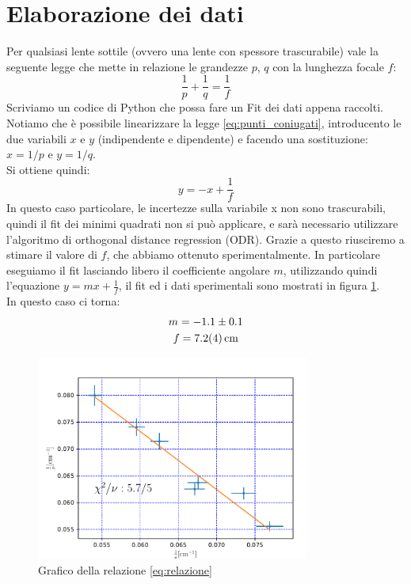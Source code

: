 \documentclass{article}
\begin{document}
\section{Elaborazione dei dati}
    Per qualsiasi lente sottile (ovvero una lente con spessore trascurabile)
    vale la seguente legge che mette in relazione le grandezze $p$, $q$ con la lunghezza
    focale $f$:
    \begin{equation}\label{eq:punti_coniugati}
        \frac{1}{p} + \frac{1}{q} = \frac{1}{f}
    \end{equation}
    Scriviamo un codice di Python che possa fare un Fit dei dati appena raccolti.
    Notiamo che è possibile linearizzare la legge \ref{eq:punti_coniugati},
    introducento le due variabili $x$ e $y$ (indipendente e dipendente) e facendo una sostituzione: $x = 1/p$ e $y = 1/q$.\\
    Si ottiene quindi:
    \begin{equation}\label{eq:relazione}
        y = -x +\frac{1}{f}
    \end{equation}
    In questo caso particolare, le incertezze sulla variabile x non sono trascurabili, quindi il fit dei minimi quadrati non si può applicare, e sarà necessario utilizzare l'algoritmo di orthogonal distance regression (ODR). Grazie a questo riusciremo a stimare il valore di $f$, che abbiamo ottenuto sperimentalmente.
    In particolare eseguiamo il fit lasciando libero il coefficiente angolare $m$, utilizzando quindi l'equazione 
    $y=mx+\frac{1}{f}$, il fit ed i dati sperimentali sono mostrati in figura \ref{fig:lente_cilindrica}.\\
    In questo caso ci torna:
    \begin{gather*}
        m = -1.1 \pm 0.1\\
        f = \SI{7.2\pm 0.4}{\cm}
    \end{gather*}
    \begin{figure}[ht!]
        \centering
        \includegraphics[width=0.8\textwidth]{extra/lente_cilindrica.pdf}
        \caption{Grafico della relazione \ref{eq:relazione}}
        \label{fig:lente_cilindrica}
    \end{figure}
\end{document}
